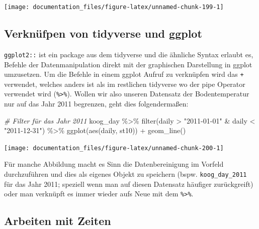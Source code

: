\documentclass[
]{article}
\newenvironment{Shaded}{\begin{snugshade}}{\end{snugshade}}
\newcommand{\CommentTok}[1]{\textcolor[rgb]{0.56,0.35,0.01}{\textit{#1}}}
\newcommand{\FunctionTok}[1]{\textcolor[rgb]{0.00,0.00,0.00}{#1}}
\newcommand{\NormalTok}[1]{#1}
\newcommand{\SpecialCharTok}[1]{\textcolor[rgb]{0.00,0.00,0.00}{#1}}
\newcommand{\StringTok}[1]{\textcolor[rgb]{0.31,0.60,0.02}{#1}}
\begin{document}
\begin{center}\texttt{[image: documentation\_files/figure-latex/unnamed-chunk-199-1]} \end{center}

\hypertarget{verknuxfcfpen-von-tidyverse-und-ggplot}{%
\subsection{Verknüfpen von tidyverse und ggplot}\label{verknuxfcfpen-von-tidyverse-und-ggplot}}

\texttt{ggplot2::} ist ein package aus dem tidyverse und die ähnliche Syntax erlaubt es, Befehle der Datenmanipulation direkt mit der graphischen Darstellung in ggplot umzusetzen. Um die Befehle in einem ggplot Aufruf zu verknüpfen wird das \texttt{+} verwendet, welches anders ist als im restlichen tidyverse wo der pipe Operator verwendet wird (\texttt{\%\textgreater{}\%}). Wollen wir also unseren Datensatz der Bodentemperatur nur auf das Jahr 2011 begrenzen, geht dies folgendermaßen:

\begin{Shaded}
\begin{Highlighting}[]
\CommentTok{\# Filter für das Jahr 2011}
\NormalTok{koog\_day }\SpecialCharTok{\%\textgreater{}\%}
  \FunctionTok{filter}\NormalTok{(daily }\SpecialCharTok{\textgreater{}} \StringTok{"2011{-}01{-}01"} \SpecialCharTok{\&}\NormalTok{ daily }\SpecialCharTok{\textless{}} \StringTok{"2011{-}12{-}31"}\NormalTok{) }\SpecialCharTok{\%\textgreater{}\%}
  \FunctionTok{ggplot}\NormalTok{(}\FunctionTok{aes}\NormalTok{(daily, st10)) }\SpecialCharTok{+}
  \FunctionTok{geom\_line}\NormalTok{()}
\end{Highlighting}
\end{Shaded}

\begin{center}\texttt{[image: documentation\_files/figure-latex/unnamed-chunk-200-1]} \end{center}

Für manche Abbildung macht es Sinn die Datenbereinigung im Vorfeld durchzuführen und dies als eigenes Objekt zu speichern (bspw. \texttt{koog\_day\_2011} für das Jahr 2011; speziell wenn man auf diesen Datensatz häufiger zurückgreift) oder man verknüpft es immer wieder aufs Neue mit dem \texttt{\%\textgreater{}\%}.

\hypertarget{arbeiten-mit-zeiten-1}{%
\subsection{Arbeiten mit Zeiten}\label{arbeiten-mit-zeiten-1}}
\end{document}
